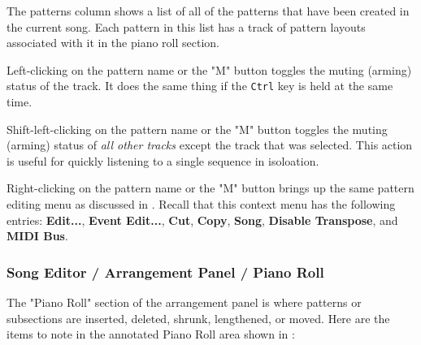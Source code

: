    The patterns column shows a list of all of the patterns that have been
   created in the current song.  Each pattern in this list has a track of
   pattern layouts associated with it in the piano roll section.

   Left-clicking on the pattern name or the "M" button toggles the muting
   (arming) status of the track.
   It does the same thing if the \texttt{Ctrl} key is held at the same time.

   Shift-left-clicking on the pattern name or the "M" button toggles the muting
   (arming) status of \textsl{all other tracks} except the track that was
   selected.  This action is useful for quickly listening to a single sequence
   in isoloation.

   Right-clicking on the pattern name or the "M" button brings up the same
   pattern editing menu as discussed in
   .
   Recall that this context menu has the following entries:
   \textbf{Edit...}, \textbf{Event Edit...}, \textbf{Cut}, \textbf{Copy},
   \textbf{Song}, \textbf{Disable Transpose}, and \textbf{MIDI Bus}.

\subsubsection{Song Editor / Arrangement Panel / Piano Roll}
\label{subsubsec:seq64_song_editor_arrangement_panel_roll}

   The "Piano Roll" section of the arrangement panel is where patterns or
   subsections are inserted, deleted, shrunk, lengthened, or moved.
   Here are the items to note in the annotated Piano Roll area
   shown in :

